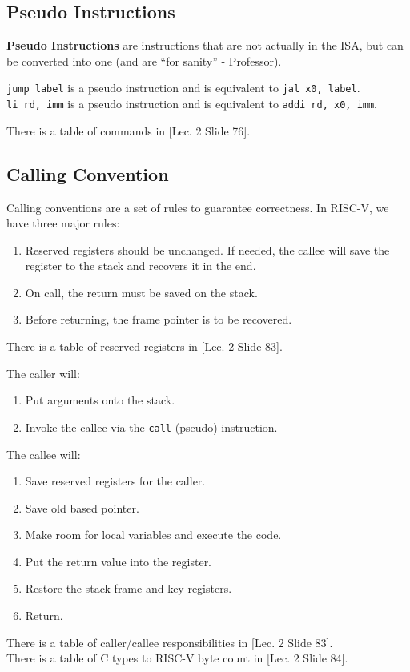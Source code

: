\documentclass{report}
\newcommand{\definition}[2]{\begin{tcolorbox}[title={Definition: #1}]{#2}\end{tcolorbox}}
\newcommand{\example}[2]{\begin{tcolorbox}[colback=blue!5!white,colframe=black!75!blue,title={Example:
      #1}]{#2}\end{tcolorbox}}
\begin{document}
\subsection{Pseudo Instructions}
\definition{Pseudo Instruction}{
  \textbf{Pseudo Instructions} are instructions that are not actually in the ISA, but can be
  converted into one (and are ``for sanity'' - Professor).
}
\example{\texttt{jump} and \texttt{li}}{
  \texttt{jump label} is a pseudo instruction and is equivalent to \texttt{jal x0, label}. \\
  \texttt{li rd, imm} is a pseudo instruction and is equivalent to \texttt{addi rd, x0, imm}.
}
There is a table of commands in [Lec. 2 Slide 76].

\subsection{Calling Convention}
Calling conventions are a set of rules to guarantee correctness. In RISC-V, we have three major
rules:

\begin{enumerate}[label=\textit{(\roman*)}]
\item Reserved registers should be unchanged. If needed, the callee will save the register to the
  stack and recovers it in the end.
\item On call, the return must be saved on the stack.
\item Before returning, the frame pointer is to be recovered.
\end{enumerate}
There is a table of reserved registers in [Lec. 2 Slide 83].


The caller will:
\begin{enumerate}[label=\textit{(\roman*)}]
\item Put arguments onto the stack.
\item Invoke the callee via the \texttt{call} (pseudo) instruction.
\end{enumerate}
The callee will:
\begin{enumerate}[label=\textit{(\roman*)}]
\item Save reserved registers for the caller.
\item Save old based pointer.
\item Make room for local variables and execute the code.
\item Put the return value into the register.
\item Restore the stack frame and key registers.
\item Return.
\end{enumerate}
There is a table of caller/callee responsibilities in [Lec. 2 Slide 83]. \\
There is a table of C types to RISC-V byte count in [Lec. 2 Slide 84].
\end{document}
